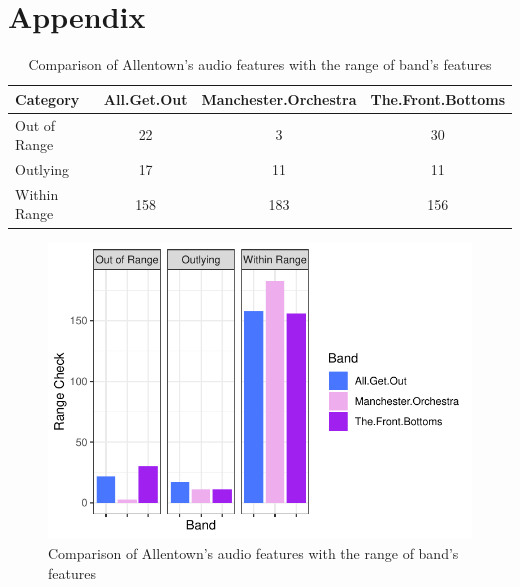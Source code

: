 \documentclass{article}\usepackage[]{graphicx}\usepackage[]{xcolor}
\makeatletter
\def\maxwidth{ %
  \ifdim\Gin@nat@width>\linewidth
    \linewidth
  \else
    \Gin@nat@width
  \fi
}
\newenvironment{knitrout}{}{} %
\makeatother
\begin{document}
\newpage
\onecolumn
\section{Appendix}
\begin{table}[ht]
\centering
\begin{tabular}{|l|c|c|c|}
  \hline
Category & All.Get.Out & Manchester.Orchestra & The.Front.Bottoms \\ 
  \hline
Out of Range &  22 &   3 &  30 \\ 
  Outlying &  17 &  11 &  11 \\ 
  Within Range & 158 & 183 & 156 \\ 
   \hline
\end{tabular}
\caption{Comparison of Allentown's audio features with the range of band's features} 
\label{allentown.tab}
\end{table}


\begin{figure}[H] \begin{center}
\begin{knitrout}
\color{fgcolor}
\includegraphics[width=\maxwidth]{figure/unnamed-chunk-7-1} 
\end{knitrout}
\caption{Comparison of Allentown's audio features with the range of band's features} \label{plot1}
\end{center}
\end{figure}
\end{document}
